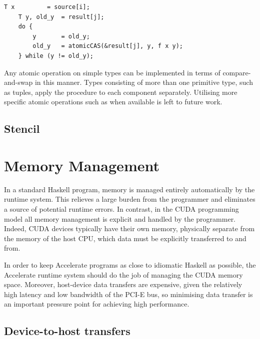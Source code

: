 \begin{lstlisting}[style=cuda]
    T x         = source[i];
    T y, old_y  = result[j];
    do {
        y       = old_y;
        old_y   = atomicCAS(&result[j], y, f x y);
    } while (y != old_y);
\end{lstlisting}
%
Any atomic operation on simple types can be implemented in terms of
compare-and-swap in this manner. Types consisting of more than one primitive
type, such as tuples, apply the procedure to each component separately.
Utilising more specific atomic operations such as  when
available is left to future work.

\subsection{Stencil}


\section{Memory Management}

In a standard Haskell program, memory is managed entirely automatically by the
runtime system. This relieves a large burden from the programmer and eliminates
a source of potential runtime errors. In contrast, in the CUDA programming model
all memory management is explicit and handled by the programmer. Indeed, CUDA
devices typically have their own memory, physically separate from the memory of
the host CPU, which data must be explicitly transferred to and from.

In order to keep Accelerate programs as close to idiomatic Haskell as possible,
the Accelerate runtime system should do the job of managing the CUDA memory
space. Moreover, host-device data transfers are expensive, given the relatively
high latency and low bandwidth of the PCI-E bus, so minimising data transfer is
an important pressure point for achieving high performance.



\subsection{Device-to-host transfers}

